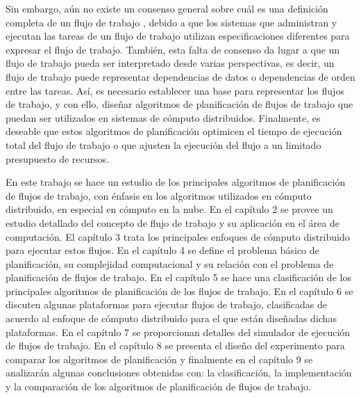 Sin embargo, aún no existe un consenso general sobre cuál es una definición completa de un flujo de trabajo \cite{van2003workflow}, debido a que los sistemas que administran y ejecutan las tareas de un flujo de trabajo utilizan especificaciones diferentes para expresar el flujo de trabajo. También, esta falta de consenso da lugar a que un flujo de trabajo pueda ser interpretado desde varias perspectivas, es decir, un flujo de trabajo puede representar dependencias de datos o dependencias de orden entre las tareas. Así, es necesario establecer una base para representar los flujos de trabajo, y con ello, diseñar algoritmos de planificación de flujos de trabajo que puedan ser utilizados en sistemas de cómputo distribuidos. Finalmente, es deseable que estos algoritmos de planificación optimicen el tiempo de ejecución total del flujo de trabajo o que ajusten la ejecución del flujo a un limitado presupuesto de recursos.




En este trabajo se hace un estudio de los principales algoritmos de planificación de flujos de trabajo, con énfasis en los algoritmos utilizados en cómputo distribuido, en especial en cómputo en la nube. En el capítulo 2 se provee un estudio detallado del concepto de flujo de trabajo y su aplicación en el área de computación. El capítulo 3 trata los principales enfoques de cómputo distribuido para ejecutar estos flujos. En el capítulo 4 se define el problema básico de planificación, su complejidad computacional y su relación con el problema de planificación de flujos de trabajo. En el capítulo 5 se hace una clasificación de los principales algoritmos de planificación de los flujos de trabajo. En el capítulo 6 se discuten	algunas plataformas para ejecutar flujos de trabajo, clasificadas de acuerdo al enfoque de cómputo distribuido para el que están diseñadas dichas plataformas. En el capítulo 7 se proporcionan detalles del simulador de ejecución de flujos de trabajo. En el capítulo 8 se presenta el diseño del experimento para comparar los algoritmos de planificación y finalmente en el capítulo 9 se analizarán algunas conclusiones obtenidas con: la clasificación, la implementación y la comparación de los algoritmos de planificación de flujos de trabajo.
